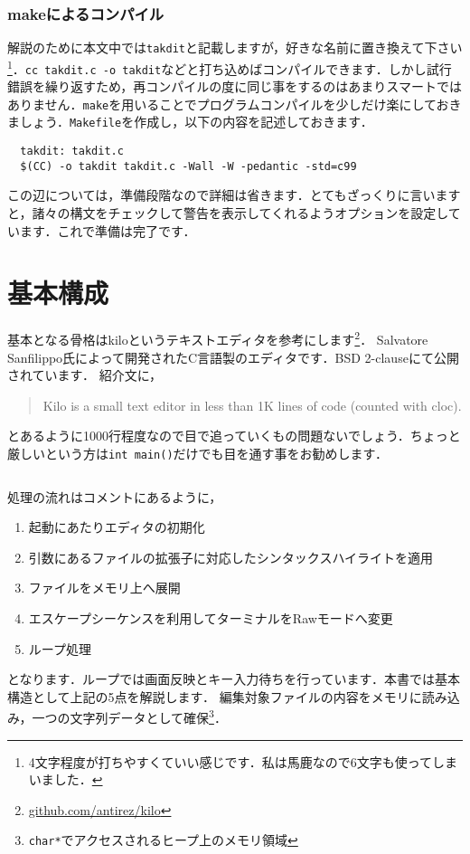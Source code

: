 \subsubsection{makeによるコンパイル}
解説のために本文中では\texttt{takdit}と記載しますが，好きな名前に置き換えて下さい\footnote{4文字程度が打ちやすくていい感じです．私は馬鹿なので6文字も使ってしまいました．}．\texttt{cc takdit.c -o takdit}などと打ち込めばコンパイルできます．しかし試行錯誤を繰り返すため，再コンパイルの度に同じ事をするのはあまりスマートではありません．\texttt{make}を用いることでプログラムコンパイルを少しだけ楽にしておきましょう．\texttt{Makefile}を作成し，以下の内容を記述しておきます．
\begin{verbatim}
  takdit: takdit.c
  $(CC) -o takdit takdit.c -Wall -W -pedantic -std=c99
\end{verbatim}
この辺については，準備段階なので詳細は省きます．とてもざっくりに言いますと，諸々の構文をチェックして警告を表示してくれるようオプションを設定しています．これで準備は完了です．

\section{基本構成}
基本となる骨格はkiloというテキストエディタを参考にします\footnote{\href{https://github.com/antirez/kilo}{github.com/antirez/kilo}}．
Salvatore Sanfilippo氏によって開発されたC言語製のエディタです．BSD 2-clauseにて公開されています．
紹介文に，
\begin{quote}
  Kilo is a small text editor in less than 1K lines of code (counted with cloc).
\end{quote}
とあるように1000行程度なので目で追っていくもの問題ないでしょう．ちょっと厳しいという方は\texttt{int main()}だけでも目を通す事をお勧めします．
\inputminted[frame=lines,framesep=2mm,baselinestretch=1.2,fontsize=\footnotesize,linenos,breaklines]{c}{\takuzooasset/main.c}
処理の流れはコメントにあるように，
\begin{enumerate}
  \item 起動にあたりエディタの初期化
  \item 引数にあるファイルの拡張子に対応したシンタックスハイライトを適用
  \item ファイルをメモリ上へ展開
  \item エスケープシーケンスを利用してターミナルをRawモードへ変更
  \item ループ処理
\end{enumerate}
となります．ループでは画面反映とキー入力待ちを行っています．本書では基本構造として上記の5点を解説します．
編集対象ファイルの内容をメモリに読み込み，一つの文字列データとして確保\footnote{\texttt{char*}でアクセスされるヒープ上のメモリ領域}．

